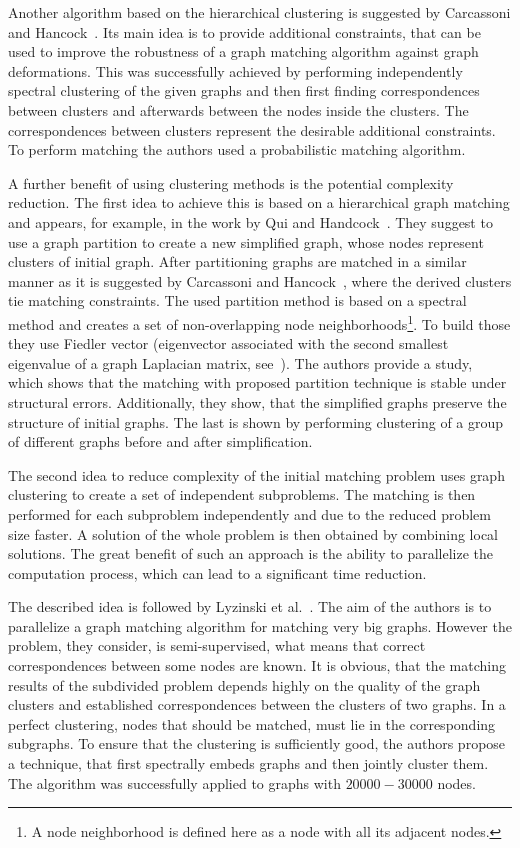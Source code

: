 Another algorithm based on the hierarchical clustering is suggested by Carcassoni and Hancock~\cite{Hancock_ModalClusters}. Its main idea is to provide additional constraints, that can be used to improve the robustness of a graph matching algorithm against graph deformations. This was successfully achieved by performing independently spectral clustering of the given graphs and then first finding correspondences between clusters and afterwards between the nodes inside the clusters. The correspondences between clusters represent the desirable additional constraints. To perform matching the authors used a probabilistic matching algorithm.

A further benefit of using clustering methods is the potential complexity reduction. 
The first idea to achieve this is based on a hierarchical graph matching and appears, for example, in the work by Qui and Handcock~\cite{Hancock_GM_SpectralPart}. They suggest to use a graph partition to create a new simplified graph, whose nodes represent clusters of initial graph. After partitioning graphs are matched in a similar manner as it is suggested by Carcassoni and Hancock~\cite{Hancock_ModalClusters}, where the derived clusters tie matching constraints. The used partition method is based on a spectral method and creates a set of non-overlapping node neighborhoods\footnote{A node neighborhood is defined here as a node with all its adjacent nodes.}. To build those they use Fiedler vector (eigenvector associated with the second smallest eigenvalue of a graph Laplacian matrix, see~\cite{Fiedler1975}). The authors provide a study, which shows that the matching with proposed partition technique is stable under structural errors. Additionally, they show, that the simplified graphs preserve the structure of initial graphs. The last is shown by performing clustering of a group of different graphs before and after simplification.

The second idea to reduce complexity of the initial matching problem uses graph clustering to create a set of independent subproblems. The matching is then performed for each subproblem independently and due to the reduced problem size faster. A solution of the whole problem is then obtained by combining local solutions. The great benefit of such an approach is the ability to parallelize the computation process, which can lead to a significant time reduction.

The described idea is followed by Lyzinski et al.~\cite{Lyzinski2015}. The aim of the authors is to parallelize a graph matching algorithm for matching very big graphs. However the problem, they consider, is semi-supervised, what means that correct correspondences between some nodes are known. It is obvious, that the matching results of the subdivided problem depends highly on the quality of the graph clusters and established correspondences between the clusters of two graphs. In a perfect clustering, nodes that should be matched, must lie in the corresponding subgraphs. To ensure that the clustering is sufficiently good, the authors propose a technique, that first spectrally embeds graphs and then jointly cluster them. The algorithm was successfully applied to graphs with $20000-30000$ nodes.

